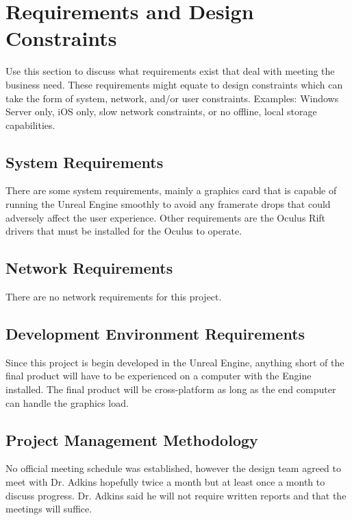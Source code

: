\hrulefill

\section{Requirements and Design Constraints}
Use this section to discuss what requirements exist that deal with meeting the 
business need.  These requirements might equate to design constraints which can 
take the form of system, network, and/or user constraints.  Examples:  Windows 
Server only, iOS only, slow network constraints, or no offline, local storage capabilities. 


\subsection{System  Requirements}
There are some system requirements, mainly a graphics card that is capable of running the Unreal Engine smoothly to avoid any framerate drops that could adversely affect the user experience.  Other requirements are the Oculus Rift drivers that must be installed for the Oculus to operate.


\subsection{Network Requirements}
There are no network requirements for this project.


\subsection{Development Environment Requirements}
Since this project is begin developed in the Unreal Engine, anything short of the final product will have to be experienced on a computer with the Engine installed.  The final product will be cross-platform as long as the end computer can handle the graphics load.

\subsection{Project  Management Methodology}
No official meeting schedule was established, however the design team agreed to meet with Dr. Adkins hopefully twice a month but at least once a month to discuss progress.  Dr. Adkins said he will not require written reports and that the meetings will suffice.

